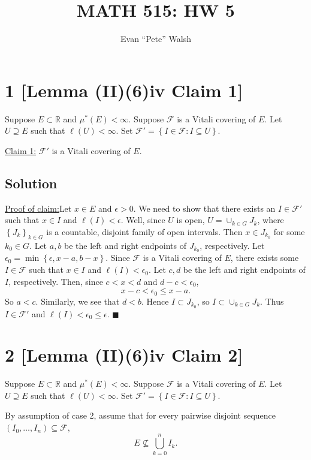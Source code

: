 \documentclass[12pt]{article}
\title{MATH 515: HW 5}
\author{Evan ``Pete'' Walsh}
\newenvironment{claimproof}[1]{\par\noindent\underline{Proof of claim:}\space#1}{\hfill $\blacksquare$}
\begin{document}
\maketitle

\section*{1 [Lemma (II)(6)iv Claim 1]}
Suppose $E\subset \mathbb{R}$ and $\mu^*(E) < \infty$. Suppose $\mathcal{F}$ is a Vitali covering of $E$. Let $U \supseteq E$ such that $\ell(U) <
\infty$. Set $\mathcal{F}' = \left\{ I \in \mathcal{F} : I \subseteq U \right\}$.

\underline{Claim 1:} $\mathcal{F}'$ is a Vitali covering of $E$.

\subsection*{Solution}

\begin{claimproof}
Let $x \in E$ and $\epsilon > 0$. We need to show that there exists an $I \in \mathcal{F}'$ such that $x \in I$ and $\ell(I) < \epsilon$. Well, since
$U$ is open, $U = \cup_{k \in G}J_{k}$, where $\left\{ J_{k} \right\}_{k \in G}$ is a countable, disjoint family of open intervals. Then $x \in
J_{k_{0}}$ for some $k_{0} \in G$. Let $a, b$ be the left and right endpoints of $J_{k_{0}}$, respectively. Let $\epsilon_{0} = \min\left\{ \epsilon, x - a, b - x
\right\}$. Since $\mathcal{F}$ is a Vitali covering of $E$, there exists some $I \in \mathcal{F}$ such that $x \in I$ and $\ell(I) < \epsilon_{0}$.
Let $c,d$ be the left and right endpoints of $I$, respectively. Then, since $c < x < d$ and $d - c < \epsilon_{0}$, 
\[ x - c < \epsilon_{0} \leq x - a. \]
So $a < c$. Similarly, we see that $d < b$. Hence $I \subset J_{k_{0}}$, so $I \subset \cup_{k \in G}J_{k}$. Thus $I \in \mathcal{F}'$ and $\ell(I) <
\epsilon_{0} \leq \epsilon$.
\end{claimproof}


\newpage
\section*{2 [Lemma (II)(6)iv Claim 2]}
Suppose $E\subset \mathbb{R}$ and $\mu^*(E) < \infty$. Suppose $\mathcal{F}$ is a Vitali covering of $E$. Let $U \supseteq E$ such that $\ell(U) <
\infty$. Set $\mathcal{F}' = \left\{ I \in \mathcal{F} : I \subseteq U \right\}$.

By assumption of case 2, assume that for every pairwise disjoint sequence $\left( I_{0}, \hdots, I_{n} \right) \subseteq \mathcal{F}$, 
\[ E \nsubseteq \bigcup_{k=0}^{n}I_{k}.\]
\end{document}
